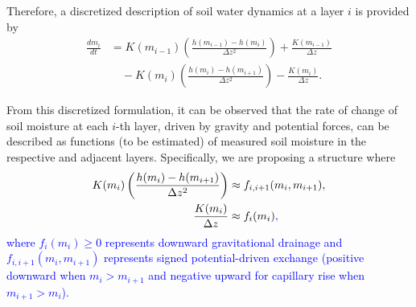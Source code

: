 \documentclass[pdflatex,sn-nature]{sn-jnl}%
\theoremstyle{thmstyleone}%
\theoremstyle{thmstyletwo}%
\theoremstyle{thmstylethree}%
\begin{document}
Therefore, a discretized description of soil water dynamics at a layer $i$ is provided by
\begin{equation}
\begin{aligned}
\frac{d m_i}{d t} &= K(m_{i-1})\left(\frac{h(m_{i-1})-h(m_{i})}{\Delta z^2}\right) + \frac{K(m_{i-1})}{\Delta z} \\
&\quad - K(m_{i})\left(\frac{h(m_{i})-h(m_{i+1})}{\Delta z^2}\right) - \frac{K(m_{i})}{\Delta z}.
\end{aligned}
\label{eq:disc_richards}
\end{equation}

From this discretized formulation, it can be observed that the rate of change of soil moisture at each $i$-th layer, driven by gravity and potential forces, can be described as functions (to be estimated) of measured soil moisture in the respective and adjacent layers. Specifically, we are proposing a structure where
\begin{equation}
\begin{aligned}
K(m_{i})\left(\frac{h(m_{i})-h(m_{i+1})}{\Delta z^2}\right) &\approx f_{i,i+1}({m}_i,{m}_{i+1}), \\ 
\frac{K(m_{i})}{\Delta z} &\approx f_i({m}_i)\textcolor{blue}{,}
\end{aligned}
\end{equation}
\textcolor{blue}{where $f_i(m_i) \ge 0$ represents downward gravitational drainage and $f_{i,i+1}(m_i, m_{i+1})$ represents signed potential-driven exchange (positive downward when $m_i > m_{i+1}$ and negative upward for capillary rise when $m_{i+1} > m_i$).}
\end{document}
